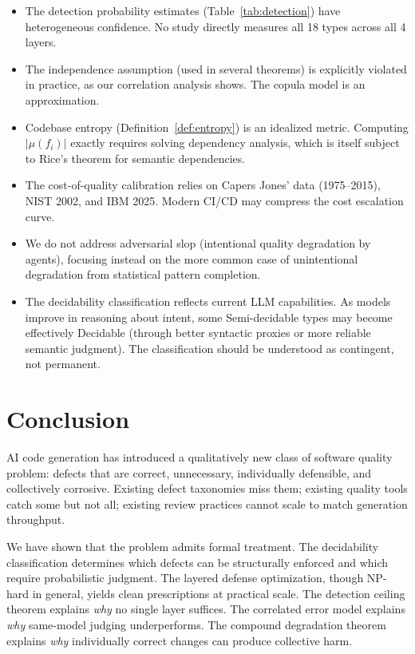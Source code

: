 \documentclass[11pt, a4paper]{article}
\theoremstyle{definition}
\theoremstyle{remark}
\begin{document}
\begin{itemize}[leftmargin=2em]
\item The detection probability estimates (Table~\ref{tab:detection}) have heterogeneous confidence. No study directly measures all 18 types across all 4 layers.
\item The independence assumption (used in several theorems) is explicitly violated in practice, as our correlation analysis shows. The copula model is an approximation.
\item Codebase entropy (Definition~\ref{def:entropy}) is an idealized metric. Computing $|\mu(f_i)|$ exactly requires solving dependency analysis, which is itself subject to Rice's theorem for semantic dependencies.
\item The cost-of-quality calibration relies on Capers Jones' data (1975--2015), NIST 2002, and IBM 2025. Modern CI/CD may compress the cost escalation curve.
\item We do not address adversarial slop (intentional quality degradation by agents), focusing instead on the more common case of unintentional degradation from statistical pattern completion.
\item The decidability classification reflects current LLM capabilities. As models improve in reasoning about intent, some Semi-decidable types may become effectively Decidable (through better syntactic proxies or more reliable semantic judgment). The classification should be understood as contingent, not permanent.
\end{itemize}


\section{Conclusion}
\label{sec:conclusion}

AI code generation has introduced a qualitatively new class of software quality problem: defects that are correct, unnecessary, individually defensible, and collectively corrosive. Existing defect taxonomies miss them; existing quality tools catch some but not all; existing review practices cannot scale to match generation throughput.

We have shown that the problem admits formal treatment. The decidability classification determines which defects can be structurally enforced and which require probabilistic judgment. The layered defense optimization, though NP-hard in general, yields clean prescriptions at practical scale. The detection ceiling theorem explains \emph{why} no single layer suffices. The correlated error model explains \emph{why} same-model judging underperforms. The compound degradation theorem explains \emph{why} individually correct changes can produce collective harm.
\end{document}
